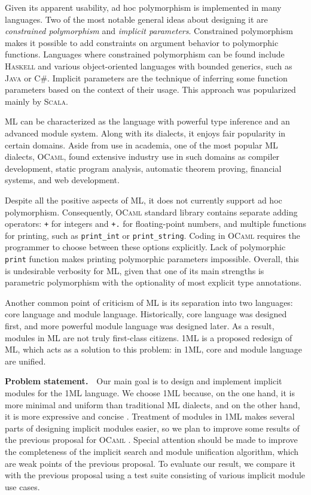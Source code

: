 \documentclass{spbau-diploma}
\begin{document}
Given its apparent usability, ad hoc polymorphism is implemented in many languages. Two of the most notable general ideas about designing it are \textit{constrained polymorphism} and \textit{implicit parameters}. Constrained polymorphism makes it possible to add constraints on argument behavior to polymorphic functions. Languages where constrained polymorphism can be found include \textsc{Haskell} and various object-oriented languages with bounded generics, such as \textsc{Java} or \textsc{C\#}. Implicit parameters are the technique of inferring some function parameters based on the context of their usage. This approach was popularized mainly by \textsc{Scala}.

\textsc{ML} can be characterized as the language with powerful type inference and an advanced module system. Along with its dialects, it enjoys fair popularity in certain domains. Aside from use in academia, one of the most popular \textsc{ML} dialects, \textsc{OCaml}, found extensive industry use in such domains as compiler development, static program analysis, automatic theorem proving, financial systems, and web development. 

Despite all the positive aspects of \textsc{ML}, it does not currently support ad hoc polymorphism. Consequently, \textsc{OCaml} standard library contains separate adding operators: \texttt{+} for integers and \texttt{+.} for floating-point numbers, and multiple functions for printing, such as \texttt{print\_int} or \texttt{print\_string}. Coding in \textsc{OCaml} requires the programmer to choose between these options explicitly. Lack of polymorphic \texttt{print} function makes printing polymorphic parameters impossible. Overall, this is undesirable verbosity for \textsc{ML}, given that one of its main strengths is parametric polymorphism with the optionality of most explicit type annotations.

Another common point of criticism of \textsc{ML} is its separation into two languages: core language and module language. Historically, core language was designed first, and more powerful module language was designed later. As a result, modules in \textsc{ML} are not truly first-class citizens. \textsc{1ML} \citep{1ml} is a proposed redesign of ML, which acts as a solution to this problem: in 1ML, core and module language are unified.

\textbf{Problem statement.}~~Our main goal is to design and implement implicit modules for the \textsc{1ML} language. We choose \textsc{1ML} because, on the one hand, it is more minimal and uniform than traditional \textsc{ML} dialects, and on the other hand, it is more expressive and concise \citep{1ml}. Treatment of modules in \textsc{1ML} makes several parts of designing implicit modules easier, so we plan to improve some results of the previous proposal for \textsc{OCaml} \citep{white}. Special attention should be made to improve the completeness of the implicit search and module unification algorithm, which are weak points of the previous proposal. To evaluate our result, we compare it with the previous proposal using a test suite consisting of various implicit module use cases.
\end{document}
